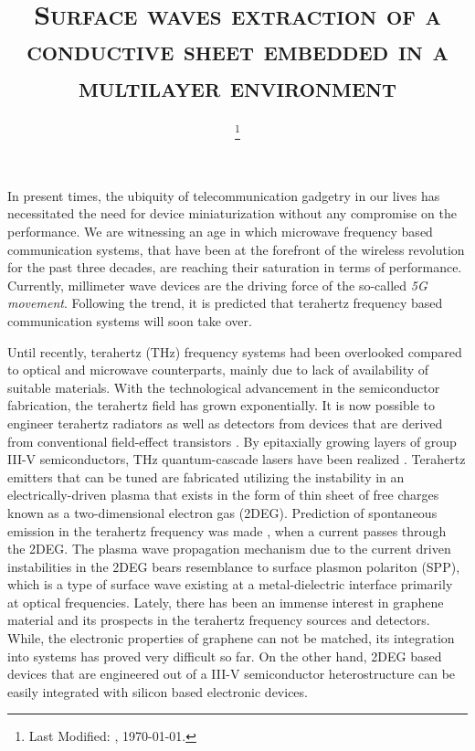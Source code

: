 \documentclass[12pt]{article}
\begin{document}
\title{\textsc{Surface waves extraction of a conductive sheet embedded in a multilayer environment}}

\date{\footnote{Last Modified: \currenttime, \today.}}

\maketitle

In present times, the ubiquity of telecommunication gadgetry in our lives has necessitated the need for device miniaturization without any compromise on the performance. We are witnessing an age in which microwave frequency based communication systems, that have been at the forefront of the wireless revolution for the past three decades, are reaching their saturation in terms of performance. Currently, millimeter wave devices are the driving force of the so-called \emph{5G movement}. Following the trend, it is predicted that terahertz frequency based communication systems will soon take over.

Until recently, terahertz (THz) frequency systems had been overlooked compared to optical and microwave counterparts, mainly due to lack of availability of suitable materials. With the technological advancement in the semiconductor fabrication, the terahertz field has grown exponentially. It is now possible to engineer terahertz radiators as well as detectors from devices that are derived from conventional field-effect transistors \cite{Kempa1991,Dyakonov1993,Dyakonov2001}. By epitaxially growing layers of group III-V semiconductors, THz quantum-cascade lasers have been realized \cite{Williams2003}. Terahertz emitters that can be tuned are fabricated utilizing the instability in an electrically-driven plasma \cite{Krasheninnikov1980} that exists in the form of thin sheet of free charges known as a two-dimensional electron gas (2DEG). Prediction of spontaneous emission in the terahertz frequency was made \cite{Kempa1991}, when a current passes through the 2DEG. The plasma wave propagation mechanism due to the current driven instabilities in the 2DEG bears resemblance to surface plasmon polariton (SPP), which is a type of surface wave existing at a metal-dielectric interface primarily at optical frequencies. Lately, there has been an immense interest in graphene material and its prospects in the terahertz frequency sources and detectors. While, the electronic properties of graphene can not be matched, its integration into systems has proved very difficult so far. On the other hand, 2DEG based devices that are engineered out of a III-V semiconductor heterostructure can be easily integrated with silicon based electronic devices.
\end{document}
